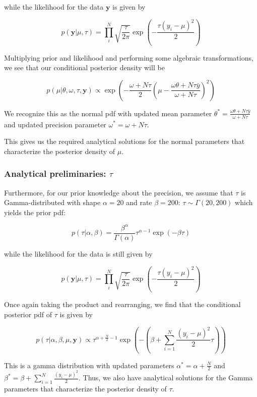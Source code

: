 \documentclass[
  11pt,
]{article}
\begin{document}
while the likelihood for the data \(\mathbf{y}\) is given by

\[
p(\mathbf{y} | \mu, \tau) = \prod_{i}^{N} \sqrt{\frac{\tau}{2\pi}} \exp\left(-\frac{\tau(y_i-\mu)^2}{2} \right)
\]

Multiplying prior and likelihood and performing some algebraic transformations, we see that our conditional posterior density will be

\[
p(\mu | \theta, \omega, \tau, \mathbf{y}) \propto \exp \left(-\frac{\omega + N \tau}{2}  \left(\mu - \frac{\omega \theta + N \tau \bar{y}}{\omega + N \tau}\right)^2 \right)
\]

We recognize this as the normal pdf with updated mean parameter \(\theta^{\ast} = \frac{\omega \theta + N \tau \bar{y}}{\omega + N \tau}\) and updated precision parameter \(\omega^{\ast} = \omega + N \tau\).

This gives us the required analytical solutions for the normal parameters that characterize the posterior density of \(\mu\).

\hypertarget{analytical-preliminaries-tau}{%
\subsubsection{\texorpdfstring{Analytical preliminaries: \(\tau\)}{Analytical preliminaries: \textbackslash tau}}\label{analytical-preliminaries-tau}}

Furthermore, for our prior knowledge about the precision, we assume that \(\tau\) is Gamma-distributed with shape \(\alpha=20\) and rate \(\beta = 200\): \(\tau \sim \Gamma(20, 200)\) which yields the prior pdf:

\[
p(\tau | \alpha, \beta) =  \frac{\beta^{\alpha}}{\Gamma(\alpha)} \tau^{\alpha - 1} \exp(-\beta \tau)
\]

while the likelihood for the data is still given by

\[
p(\mathbf{y} | \mu, \tau) = \prod_{i}^{N} \sqrt{\frac{\tau}{2\pi}} \exp\left(-\frac{\tau(y_i-\mu)^2}{2}\right)
\]

Once again taking the product and rearranging, we find that the conditional posterior pdf of \(\tau\) is given by

\[
p(\tau | \alpha, \beta, \mu, \mathbf{y}) \propto \tau^{\alpha + \frac{N}{2} - 1} \exp\left(-\left(\beta + \sum_{i=1}^{N} \frac{(y_i - \mu)^2}{2} \tau\right)\right)
\]

This is a gamma distribution with updated parameters \(\alpha^{\ast} = \alpha + \frac{N}{2}\) and \(\beta^{\ast} = \beta + \sum_{i=1}^{N} \frac{(y_i - \mu)^2}{2}\). Thus, we also have analytical solutions for the Gamma parameters that characterize the posterior density of \(\tau\).
\end{document}
